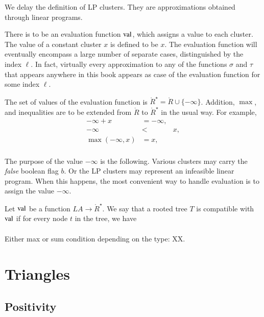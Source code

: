 We delay the definition of LP clusters.  They are approximations
obtained through linear programs.



There is to be an evaluation function ${\operatorname{val}}$, which assigns a value
to each cluster.  The value of a constant cluster $x$ is defined to be $x$.
The evaluation function will eventually encompass a large number of
separate cases, distinguished by the index $\ell$.  
In fact, virtually every approximation
to any of the functions $\sigma$ and $\tau$ that appears anywhere
in this book appears as case of the evaluation function for some index
$\ell$.

The set of values of the evaluation function is 
$\ring{R}^\star = \ring{R}\cup\{-\infty\}$.
Addition, $\max$, and inequalities are to be extended from
$\ring{R}$ to $\ring{R}^\star$ in the usual way.  For example,
  $$
  \begin{array}{lll}
    -\infty + x &= -\infty,\\
    -\infty &< & x,\\
    \max(-\infty,x) &= x,\\
    \end{array}
  $$

The purpose of the value $-\infty$ is the following.  Various
clusters may carry the {\it false} boolean flag $b$.  Or the
LP clusters may represent an infeasible linear program.  When
this happens, the most convenient way to handle evaluation is
to assign the value $-\infty$.

\begin{definition}
Let ${\operatorname{val}}$
be a function $LA\to \ring{R}^\star$.  We say that
a rooted tree $T$ is compatible with ${\operatorname{val}}$ if for every
node $t$ in the tree, we have
   $$
   \begin{array}{lll}
     \end{array}
   $$
\end{definition}

Either max or sum condition depending on the type: XX.

\section{Triangles}


\subsection{Positivity}%
    \label{sec:pos}

